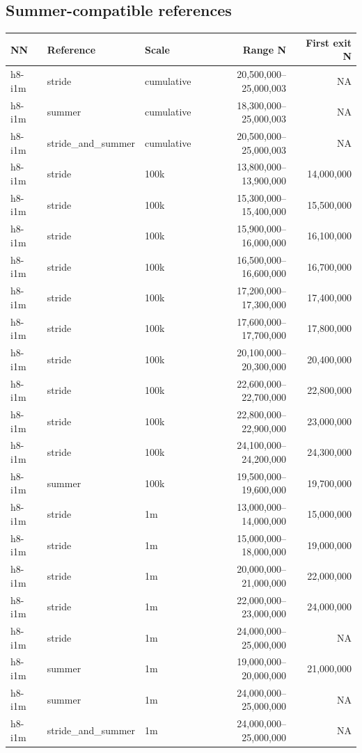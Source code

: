 \documentclass[10pt]{article}
\begin{document}
\subsection{Summer-compatible references}

\scriptsize\begin{longtable}{lllrr}\toprule NN & Reference & Scale & Range N & First exit N \\\midrule\endhead
h8-i1m & stride & cumulative & 20,500,000--25,000,003 & NA \\
h8-i1m & summer & cumulative & 18,300,000--25,000,003 & NA \\
h8-i1m & stride\_and\_summer & cumulative & 20,500,000--25,000,003 & NA \\
h8-i1m & stride & 100k & 13,800,000--13,900,000 & 14,000,000 \\
h8-i1m & stride & 100k & 15,300,000--15,400,000 & 15,500,000 \\
h8-i1m & stride & 100k & 15,900,000--16,000,000 & 16,100,000 \\
h8-i1m & stride & 100k & 16,500,000--16,600,000 & 16,700,000 \\
h8-i1m & stride & 100k & 17,200,000--17,300,000 & 17,400,000 \\
h8-i1m & stride & 100k & 17,600,000--17,700,000 & 17,800,000 \\
h8-i1m & stride & 100k & 20,100,000--20,300,000 & 20,400,000 \\
h8-i1m & stride & 100k & 22,600,000--22,700,000 & 22,800,000 \\
h8-i1m & stride & 100k & 22,800,000--22,900,000 & 23,000,000 \\
h8-i1m & stride & 100k & 24,100,000--24,200,000 & 24,300,000 \\
h8-i1m & summer & 100k & 19,500,000--19,600,000 & 19,700,000 \\
h8-i1m & stride & 1m & 13,000,000--14,000,000 & 15,000,000 \\
h8-i1m & stride & 1m & 15,000,000--18,000,000 & 19,000,000 \\
h8-i1m & stride & 1m & 20,000,000--21,000,000 & 22,000,000 \\
h8-i1m & stride & 1m & 22,000,000--23,000,000 & 24,000,000 \\
h8-i1m & stride & 1m & 24,000,000--25,000,000 & NA \\
h8-i1m & summer & 1m & 19,000,000--20,000,000 & 21,000,000 \\
h8-i1m & summer & 1m & 24,000,000--25,000,000 & NA \\
h8-i1m & stride\_and\_summer & 1m & 24,000,000--25,000,000 & NA \\

\end{longtable}
\end{document}
